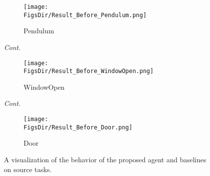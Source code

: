 \begin{landscape}
  \begin{figure}[H]
    \centering
    \begin{subfigure}[b]{\linewidth}
      \centering
      \texttt{[image: \\FigsDir/Result\_Before\_Pendulum.png]}
      \caption{\centering Pendulum}
    \end{subfigure}
    \caption{\textit{Cont}.}
  \end{figure}
  \begin{figure}[H]\ContinuedFloat
    \centering
    \begin{subfigure}[b]{\linewidth}
      \centering
      \texttt{[image: \\FigsDir/Result\_Before\_WindowOpen.png]}
      \caption{\centering WindowOpen}
    \end{subfigure}
    \caption{\textit{Cont}.}
  \end{figure}
  \begin{figure}[H]\ContinuedFloat
    \centering
    \begin{subfigure}[b]{\linewidth}
      \centering
      \texttt{[image: \\FigsDir/Result\_Before\_Door.png]}
      \caption{\centering Door}
    \end{subfigure}
    \caption{A visualization of the behavior of the proposed agent and baselines on source tasks.\label{ch:DTAIL:fig:Result_Before_Source}}
  \end{figure}
\end{landscape}



